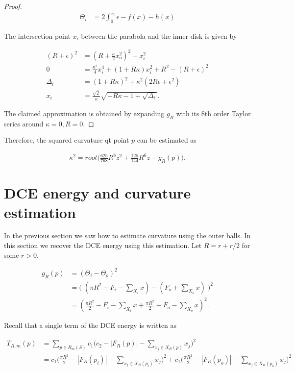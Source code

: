 \begin{proof}
\begin{align*}
	\Theta_i &= 2\int_{0}^{x_i}{\epsilon - f(x) - h(x)}	\end{align*}

The intersection point $x_i$ between the parabola and the inner disk is given by
	
\begin{align*}
	(R+\epsilon)^2 &= (R+\frac{\kappa}{2}x_o^2)^2 + x_i^2\\
	0 &= \frac{\kappa^2}{4}x_i^4 + (1+R\kappa)x_i^2 + R^2 - (R+\epsilon)^2	\\
\Delta_i &= (1+R\kappa)^2 + \kappa^2(2R\epsilon + \epsilon^2)\\
x_i &= \frac{\sqrt{2}}{\kappa}\sqrt{-R\kappa-1+\sqrt{\Delta_i}}.
\end{align*}

The claimed approximation is obtained by expanding $g_R$ with its  8th order Taylor series around $\kappa=0,R=0$.
\end{proof}

Therefore, the squared curvature qt point $p$ can be estimated as

\begin{align*}
	\kappa ^2 = root \big( \frac{625}{768}R^8z^2 + \frac{125}{144}R^6z - g_R(p) \big).
\end{align*}

\section{DCE energy and curvature estimation}

In the previous section we saw how to estimate curvature using the outer balls. In this section we recover the DCE energy using this estimation. Let $R=r+r/2$ for some $r>0$.

\begin{align*}
	g_{R}(p) &= ( \Theta_i - \Theta_o )^2 \\
		   &= \big(\; ( \pi R^2 - F_i - \sum_{X_i}{x} ) - (F_o + \sum_{X_o}{x}) \;\big)^2 \\
		   &= ( \frac{\pi R^2}{2} - F_i - \sum_{X_i}{x} + \frac{\pi R^2}{2} - F_o - \sum_{X_o}{x} )^2.
\end{align*}

Recall that a single term of the DCE energy is written as


\begin{align*}
  T_{R,m}(p) &=  \sum_{p \in R_m(S)}{ c_1\Big( c_2 - |F_{R}(p)| - \sum_{x_j \in X_R(p)} {x_j} \Big)^2 } \\
  	  &= c_1\Big( \frac{\pi R^2}{2} - |F_{R}(p_i)| - \sum_{x_j \in X_{R}(p_{i})} {x_j} \Big)^2 + c_1\Big( \frac{\pi R^2}{2} - |F_{R}(p_o)| - \sum_{x_j \in X_{R}(p_{o})} {x_j} \Big)^2
\end{align*}

